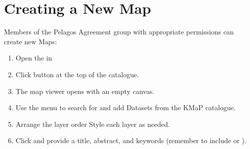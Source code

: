 \documentclass[letterpaper,10pt,english]{sphinxmanual}
\begin{document}
\section{Creating a New Map}
\label{\detokenize{04_exploring_maps:creating-a-new-map}}
\sphinxAtStartPar
Members of the Pelagos Agreement group with appropriate permissions can create new Maps:
\begin{enumerate}
%
\item {} 
\sphinxAtStartPar
Open the  in 

\item {} 
\sphinxAtStartPar
Click   button at the top of the catalogue.

\item {} 
\sphinxAtStartPar
The map viewer opens with an empty canvas.

\item {} 
\sphinxAtStartPar
Use the  menu to search for and add
Datasets from the KMaP catalogue.

\item {} 
\sphinxAtStartPar
Arrange the layer order Style each layer as needed.

\item {} 
\sphinxAtStartPar
Click  and provide a title, abstract, and keywords
(remember to include  or ).

\end{enumerate}



\renewcommand{\indexname}{Index}
\printindex
\end{document}
